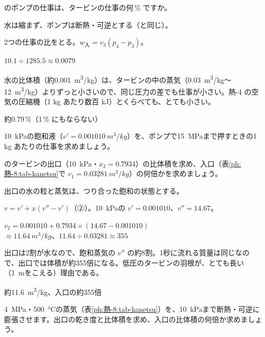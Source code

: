 \begin{reidai}[ポンプの仕事はどれくらい？]
\label{ph:熱-8:ex7}のポンプの仕事は、タービンの仕事の何\,\% ですか。
\par{} 水は縮まず、ポンプは断熱・可逆とする（と同じ）。
\par\kangaekata 2つの仕事の比をとる。$w_{\text{入}}=v_3(p_4-p_3)$。
\par\shiki $10.1\div1285.5\approx0.0079$
\par{} 水の比体積（約\qty{0.001}{m^3/kg}）は、タービンの中の蒸気（\qty{0.03}{m^3/kg}〜\qty{12}{m^3/kg}）よりずっと小さいので、同じ圧力の差でも仕事が小さい。熱-4 の空気の圧縮機（1 kg あたり数百 kJ）とくらべても、とても小さい。
\par\kotae 約0.79\,\%（1\,\% にもならない）
\end{reidai}
\begin{jibun}
\qty{10}{kPa}の飽和液（$v'=\qty{0.001010}{m^3/kg}$）を、ポンプで\qty{15}{MPa}まで押すときの1 kg あたりの仕事を求めましょう。
\end{jibun}

\begin{reidai}
\label{ph:熱-8:ex8}のタービンの出口（\qty{10}{kPa}・$x_2=0.7934$）の比体積を求め、入口（表\ref{ph:熱-8:tab-kanetsu}で $v_1=\qty{0.03281}{m^3/kg}$）の何倍かを求めましょう。
\par{} 出口の水の粒と蒸気は、つり合った飽和の状態とする。
\par\kangaekata $v=v'+x(v''-v')$（②）。\qty{10}{kPa}の $v'=0.001010$、$v''=14.67$。
\par\shiki $v_2=0.001010+0.7934\times(14.67-0.001010)$\\ \hspace*{2\zw}$\approx\qty{11.64}{m^3/kg}$、$11.64\div0.03281\approx355$
\par{} 出口は2割が水なので、飽和蒸気の $v''$ の約8割。1秒に流れる質量は同じなので、出口では体積が約355倍になる。低圧のタービンの羽根が、とても長い（\qty{1}{m}をこえる）理由である。
\par\kotae 約\qty{11.6}{m^3/kg}、入口の約355倍
\end{reidai}
\begin{jibun}
\qty{4}{MPa}・\qty{500}{\celsius}の蒸気（表\ref{ph:熱-8:tab-kanetsu}）を、\qty{10}{kPa}まで断熱・可逆に膨張させます。出口の乾き度と比体積を求め、入口の比体積の何倍か求めましょう。
\end{jibun}

